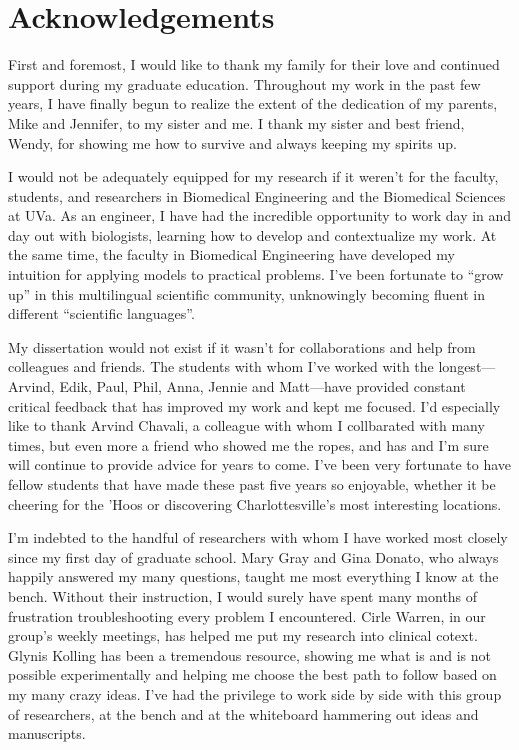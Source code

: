 \chapter{Acknowledgements}

First and foremost, I would like to thank my family for their
love and continued support during my graduate education. 
Throughout my work in the past few years, I have finally begun to realize
the extent of the dedication of my parents, Mike and Jennifer, to
my sister and me. I thank my sister and 
best friend, Wendy, for showing me how to survive and always 
keeping my spirits up.

I would not be adequately equipped for my research if it weren't for
the faculty, students, and researchers in Biomedical Engineering
and the Biomedical Sciences at UVa.
As an engineer, I have had the incredible opportunity to work day in and day out
with biologists, learning how to develop and contextualize my work.
At the same time, the faculty in Biomedical Engineering have developed my intuition for applying
models to practical problems.
I've been fortunate to ``grow up'' in 
this multilingual scientific community, unknowingly becoming fluent in different 
``scientific languages''.

My dissertation would not exist if it wasn't for collaborations
and help from colleagues and friends.
The students with whom I've worked with the longest---Arvind, 
Edik, Paul, Phil, Anna, Jennie and Matt---have provided constant critical feedback
that has improved my work and kept me focused. 
I'd especially like to thank
Arvind Chavali, a colleague with whom I collbarated with many times, but even more
a friend who showed me the ropes, and has and I'm sure will continue to provide advice
for years to come. I've been very fortunate to have fellow students that
have made these past five years so enjoyable, whether it be cheering for the 'Hoos
or discovering Charlottesville's most interesting locations.

I'm indebted to the handful of researchers with whom I have worked most closely
since my first day of graduate school. 
Mary Gray and Gina Donato, who always happily
answered my many questions, taught me most everything I know at the bench.
Without their instruction, I would surely have spent many months of frustration
troubleshooting every problem I encountered.
Cirle Warren, in our group's weekly meetings, has helped me
put my research into clinical cotext.
Glynis Kolling has been a tremendous resource, showing me what 
is and is not possible experimentally and helping me choose the best
path to follow based on my many crazy ideas.
I've had the privilege to work side by side with this group of researchers,
at the bench and at the whiteboard hammering out ideas and manuscripts.

